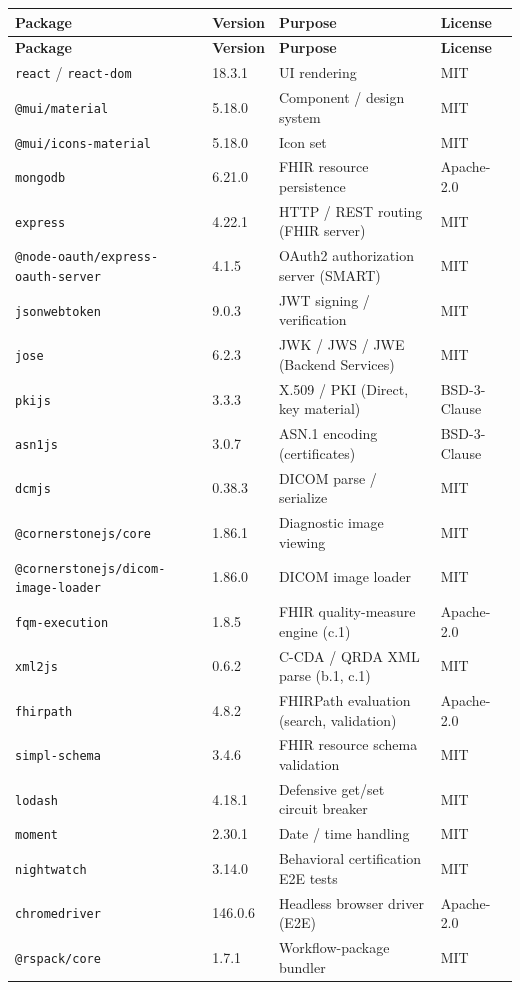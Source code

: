 \begin{center}
\begin{longtable}{@{}p{}p{}p{}p{}@{}}
\toprule
\textbf{Package} & \textbf{Version} & \textbf{Purpose} & \textbf{License} \\
\midrule
\endfirsthead
\toprule
\textbf{Package} & \textbf{Version} & \textbf{Purpose} & \textbf{License} \\
\midrule
\endhead
\bottomrule
\endfoot
\texttt{react} / \texttt{react-dom} & 18.3.1 & UI rendering & MIT \\
\texttt{@mui/material} & 5.18.0 & Component / design system & MIT \\
\texttt{@mui/icons-material} & 5.18.0 & Icon set & MIT \\
\texttt{mongodb} & 6.21.0 & FHIR resource persistence & Apache-2.0 \\
\texttt{express} & 4.22.1 & HTTP / REST routing (FHIR server) & MIT \\
\texttt{@node-oauth/express-oauth-server} & 4.1.5 & OAuth2 authorization server (SMART) & MIT \\
\texttt{jsonwebtoken} & 9.0.3 & JWT signing / verification & MIT \\
\texttt{jose} & 6.2.3 & JWK / JWS / JWE (Backend Services) & MIT \\
\texttt{pkijs} & 3.3.3 & X.509 / PKI (Direct, key material) & BSD-3-Clause \\
\texttt{asn1js} & 3.0.7 & ASN.1 encoding (certificates) & BSD-3-Clause \\
\texttt{dcmjs} & 0.38.3 & DICOM parse / serialize & MIT \\
\texttt{@cornerstonejs/core} & 1.86.1 & Diagnostic image viewing & MIT \\
\texttt{@cornerstonejs/dicom-image-loader} & 1.86.0 & DICOM image loader & MIT \\
\texttt{fqm-execution} & 1.8.5 & FHIR quality-measure engine (c.1) & Apache-2.0 \\
\texttt{xml2js} & 0.6.2 & C-CDA / QRDA XML parse (b.1, c.1) & MIT \\
\texttt{fhirpath} & 4.8.2 & FHIRPath evaluation (search, validation) & Apache-2.0 \\
\texttt{simpl-schema} & 3.4.6 & FHIR resource schema validation & MIT \\
\texttt{lodash} & 4.18.1 & Defensive get/set circuit breaker & MIT \\
\texttt{moment} & 2.30.1 & Date / time handling & MIT \\
\texttt{nightwatch} & 3.14.0 & Behavioral certification E2E tests & MIT \\
\texttt{chromedriver} & 146.0.6 & Headless browser driver (E2E) & Apache-2.0 \\
\texttt{@rspack/core} & 1.7.1 & Workflow-package bundler & MIT \\
\end{longtable}
\end{center}

